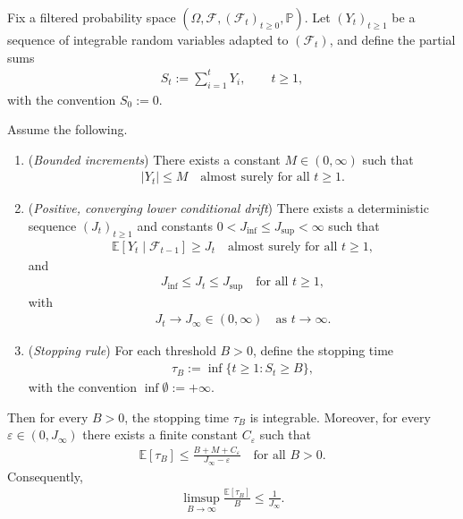 \begin{theorem}
\label{thm:dynamic-hitting-time-lower-bound-drift}
Fix a filtered probability space
$(\Omega,\mathcal{F},(\mathcal{F}_t)_{t\geq 0},\mathbb{P})$.
Let $(Y_t)_{t\geq 1}$ be a sequence of integrable random variables adapted to
$(\mathcal{F}_t)$, and define the partial sums
\begin{align*}
S_t := \sum_{i=1}^t Y_i, \qquad t \geq 1,
\end{align*}
with the convention $S_0 := 0$.

Assume the following.

\begin{enumerate}
\item[(A1)] (\emph{Bounded increments})
There exists a constant $M \in (0,\infty)$ such that
\begin{align*}
|Y_t| \leq M \quad \text{almost surely for all } t \geq 1 .
\end{align*}

\item[(A2$\ge$)] (\emph{Positive, converging lower conditional drift})
There exists a deterministic sequence $(J_t)_{t\geq 1}$ and constants
$0 < J_{\inf} \leq J_{\sup} < \infty$ such that
\begin{align*}
\mathbb{E}[Y_t \mid \mathcal{F}_{t-1}] \geq J_t
\quad \text{almost surely for all } t \geq 1 ,
\end{align*}
and
\begin{align*}
J_{\inf} \leq J_t \leq J_{\sup} \quad \text{for all } t \geq 1 ,
\end{align*}
with
\begin{align*}
J_t \longrightarrow J_\infty \in (0,\infty)
\quad \text{as } t \to \infty .
\end{align*}

\item[(A3)] (\emph{Stopping rule})
For each threshold $B > 0$, define the stopping time
\begin{align*}
\tau_B := \inf\{ t \geq 1 : S_t \geq B \},
\end{align*}
with the convention $\inf\emptyset := +\infty$.
\end{enumerate}

Then for every $B > 0$, the stopping time $\tau_B$ is integrable. Moreover,
for every $\varepsilon \in (0, J_\infty)$ there exists a finite constant
$C_\varepsilon$ such that
\begin{align*}
\mathbb{E}[\tau_B]
\leq \frac{B + M + C_\varepsilon}{J_\infty - \varepsilon}
\quad \text{for all } B > 0 .
\end{align*}
Consequently,
\begin{align*}
\limsup_{B \to \infty}
\frac{\mathbb{E}[\tau_B]}{B}
\leq \frac{1}{J_\infty} .
\end{align*}


\end{theorem}
